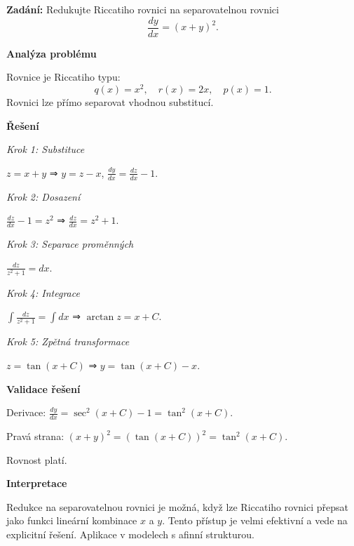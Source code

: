 \vspace{2\baselineskip}

\begin{example}
\label{ex:b2-stredni-redukce-separovatelna}

\noindent\textbf{Zadání:} Redukujte Riccatiho rovnici na separovatelnou rovnici
\[
\frac{dy}{dx} = (x + y)^2.
\]

\vspace{1.5\baselineskip}

\noindent\textbf{Analýza problému}

\noindent Rovnice je Riccatiho typu:
\[
q(x) = x^2, \quad r(x) = 2x, \quad p(x) = 1.
\]
Rovnici lze přímo separovat vhodnou substitucí.

\vspace{1.5\baselineskip}

\noindent\textbf{Řešení}

\noindent\textit{Krok 1: Substituce}

$z = x + y$ ⇒ $y = z - x$, $\frac{dy}{dx} = \frac{dz}{dx} - 1$.

\noindent\textit{Krok 2: Dosazení}

$\frac{dz}{dx} - 1 = z^2$ ⇒ $\frac{dz}{dx} = z^2 + 1$.

\noindent\textit{Krok 3: Separace proměnných}

$\frac{dz}{z^2 + 1} = dx$.

\noindent\textit{Krok 4: Integrace}

$\int \frac{dz}{z^2 + 1} = \int dx$ ⇒ $\arctan z = x + C$.

\noindent\textit{Krok 5: Zpětná transformace}

$z = \tan(x + C)$ ⇒ $y = \tan(x + C) - x$.

\vspace{1.5\baselineskip}

\noindent\textbf{Validace řešení}

Derivace: $\frac{dy}{dx} = \sec^2(x + C) - 1 = \tan^2(x + C)$.

Pravá strana: $(x + y)^2 = (\tan(x + C))^2 = \tan^2(x + C)$.

Rovnost platí.

\vspace{1.5\baselineskip}

\noindent\textbf{Interpretace}

Redukce na separovatelnou rovnici je možná, když lze Riccatiho rovnici přepsat 
jako funkci lineární kombinace $x$ a $y$. Tento přístup je velmi efektivní 
a vede na explicitní řešení. Aplikace v modelech s afinní strukturou.

\end{example}

